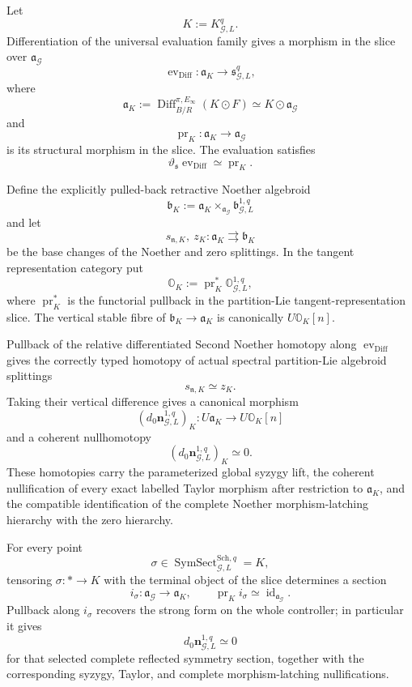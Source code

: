 \begin{theorem}
\label{thm:symmetry-noether-universal-strong-differentiated-second-noether-form}
Let
\[
K:=K_{\mathcal G,L}^{q}.
\]
Differentiation of the universal evaluation family gives a morphism in the slice
over $\mathfrak a_{\mathcal G}$
\[
\boxed{
\operatorname{ev}_{\mathrm{Diff}}:
\mathfrak a_K
\longrightarrow
\mathfrak s_{\mathcal G,L}^{q},
}
\]
where
\[
\boxed{
\mathfrak a_K
:=
\operatorname{Diff}^{\pi,E_\infty}_{B/R}(K\odot F)
\simeq
K\odot\mathfrak a_{\mathcal G}
}
\]
and
\[
\operatorname{pr}_K:
\mathfrak a_K
\longrightarrow
\mathfrak a_{\mathcal G}
\]
is its structural morphism in the slice.  The evaluation satisfies
\[
\vartheta_{\mathfrak s}\operatorname{ev}_{\mathrm{Diff}}
\simeq
\operatorname{pr}_K.
\]

Define the explicitly pulled-back retractive Noether algebroid
\[
\boxed{
\mathfrak b_K
:=
\mathfrak a_K
\times_{\mathfrak a_{\mathcal G}}
\mathfrak b_{\mathcal G,L}^{1,q}
}
\]
and let
\[
s_{\mathfrak n,K},\ z_K:
\mathfrak a_K
\rightrightarrows
\mathfrak b_K
\]
be the base changes of the Noether and zero splittings.  In the tangent
representation category put
\[
\boxed{
\mathbb O_K
:=
\operatorname{pr}_K^*\mathbb O_{\mathcal G,L}^{1,q},
}
\]
where $\operatorname{pr}_K^*$ is the functorial pullback in the partition-Lie
tangent-representation slice.  The vertical stable fibre of
$\mathfrak b_K\to\mathfrak a_K$ is canonically
$U\mathbb O_K[n]$.

Pullback of the relative differentiated Second Noether homotopy along
$\operatorname{ev}_{\mathrm{Diff}}$ gives the correctly typed homotopy of actual
spectral partition-Lie algebroid splittings
\[
\boxed{
s_{\mathfrak n,K}\simeq z_K.
}
\]
Taking their vertical difference gives a canonical morphism
\[
(d_0\mathbf n_{\mathcal G,L}^{1,q})_K:
U\mathfrak a_K
\longrightarrow
U\mathbb O_K[n]
\]
and a coherent nullhomotopy
\[
\boxed{
(d_0\mathbf n_{\mathcal G,L}^{1,q})_K\simeq0.
}
\]
These homotopies carry the parameterized global syzygy lift, the coherent
nullification of every exact labelled Taylor morphism after restriction to
$\mathfrak a_K$, and the compatible identification of the complete Noether
morphism-latching hierarchy with the zero hierarchy.

For every point
\[
\sigma\in
\operatorname{SymSect}_{\mathcal G,L}^{\mathrm{Sch},q}=K,
\]
tensoring $\sigma:*\to K$ with the terminal object of the slice determines a
section
\[
i_\sigma:
\mathfrak a_{\mathcal G}
\longrightarrow
\mathfrak a_K,
\qquad
\operatorname{pr}_K i_\sigma\simeq\operatorname{id}_{\mathfrak a_{\mathcal G}}.
\]
Pullback along $i_\sigma$ recovers the strong form on the whole controller; in
particular it gives
\[
\boxed{
d_0\mathbf n_{\mathcal G,L}^{1,q}\simeq0
}
\]
for that selected complete reflected symmetry section, together with the
corresponding syzygy, Taylor, and complete morphism-latching nullifications.
\end{theorem}

